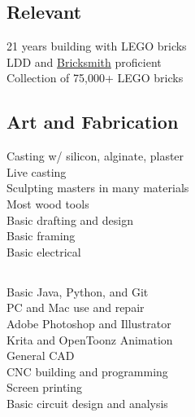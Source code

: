 \documentclass[a4paper]{deedy-resume} %
\begin{document}
    \begin{minipage}[t]{0.33\textwidth}
        \subsection{Relevant}
        
            \textbullet{} 21 years building with LEGO bricks\\
            \textbullet{} LDD and \href{http://bricksmith.sourceforge.net/}{Bricksmith} proficient\\
            \textbullet{} Collection of  75,000+ LEGO bricks
        
    \end{minipage}
    \begin{minipage}[t]{0.29\textwidth}
    
        \subsection{Art and Fabrication}
        
            \textbullet{} Casting w/ silicon, alginate, plaster\\
            \textbullet{} Live casting\\
            \textbullet{} Sculpting masters in many materials\\
            \textbullet{} Most wood tools \\
            \textbullet{} Basic drafting and design\\
            \textbullet{} Basic framing \\
            \textbullet{} Basic electrical \\
        
    \end{minipage}
    \begin{minipage}[t]{0.29\textwidth}
    
        \subsection{}
        
            \textbullet{} Basic Java, Python, and Git \\
            \textbullet{} PC and Mac use and repair \\
            \textbullet{} Adobe Photoshop and Illustrator \\
            \textbullet{} Krita and OpenToonz Animation \\
            \textbullet{} General CAD \\
        
            \textbullet{} CNC building and programming \\
            \textbullet{} Screen printing\\
            \textbullet{} Basic circuit design and analysis\\
    
    \end{minipage}
\end{document}
